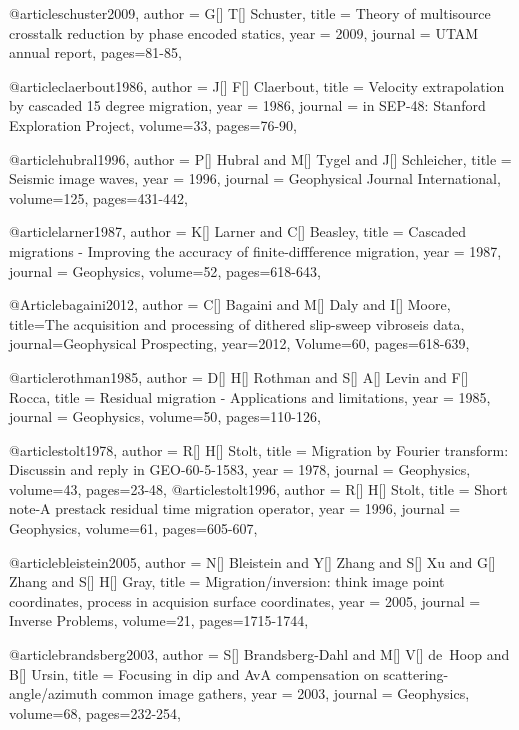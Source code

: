 @article{schuster2009,
  author =	 {G[] T[] Schuster},
  title =	 {Theory of multisource crosstalk reduction by phase encoded statics},
  year =	 2009,
  journal =	 {UTAM annual report},
 pages=81-85,
}

@article{claerbout1986,
  author =	 {J[] F[] Claerbout},
  title =	 {Velocity extrapolation by cascaded 15 degree migration},
  year =	 1986,
  journal =	 {in SEP-48: Stanford Exploration Project},
  volume={33},
 pages=76-90,
}

@article{hubral1996,
  author =	 {P[] Hubral and M[] Tygel and J[] Schleicher},
  title =	 {Seismic image waves},
  year =	 1996,
  journal =	 {Geophysical Journal International},
  volume={125},
 pages=431-442,
}

@article{larner1987,
  author =	 {K[] Larner and C[] Beasley},
  title =	 {Cascaded migrations - Improving the accuracy of finite-diffference migration},
  year =	 1987,
  journal =	 {Geophysics},
  volume={52},
 pages=618-643,
}

@Article{bagaini2012,
  author = {C[] Bagaini and M[] Daly and I[] Moore},
  title={The acquisition and processing of dithered slip-sweep vibroseis data},
  journal={Geophysical Prospecting},
  year=2012,
  Volume=60,
  pages={618-639},
}

@article{rothman1985,
  author =	 {D[] H[] Rothman and S[] A[] Levin and F[] Rocca},
  title =	 {Residual  migration - Applications and limitations},
  year =	 1985,
  journal =	 {Geophysics},
  volume={50},
 pages=110-126,
}

@article{stolt1978,
  author =	 {R[] H[] Stolt},
  title =	 {Migration by {F}ourier transform: Discussin and reply in GEO-60-5-1583},
  year =	 1978,
  journal =	 {Geophysics},
  volume={43},
 pages=23-48,
}
@article{stolt1996,
  author =	 {R[] H[] Stolt},
  title =	 {Short note-A prestack residual time migration operator},
  year =	 1996,
  journal =	 {Geophysics},
  volume={61},
 pages=605-607,
}

@article{bleistein2005,
  author =	 {N[] Bleistein and Y[] Zhang and S[] Xu and G[] Zhang and S[] H[] Gray},
  title =	 {Migration/inversion: think image point coordinates, process in acquision surface coordinates},
  year =	 2005,
  journal =	 {Inverse Problems},
  volume={21},
 pages=1715-1744,
}

@article{brandsberg2003,
  author =	 {S[] Brandsberg-Dahl and M[] V[] de~Hoop and B[] Ursin},
  title =	 {Focusing in dip and AvA compensation on scattering-angle/azimuth common image gathers},
  year =	 2003,
  journal =	 {Geophysics},
  volume={68},
 pages=232-254,
}

